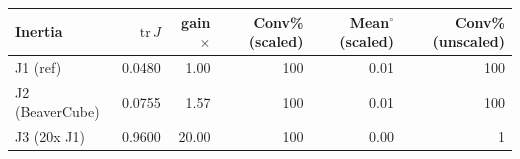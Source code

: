 \begin{tabular}{l r r r r r}
\toprule
Inertia & $\mathrm{tr}\,J$ & gain$\times$ & Conv\% (scaled) & Mean$^\circ$ (scaled) & Conv\% (unscaled) \\
\midrule
J1 (ref) & 0.0480 & 1.00 & 100 & 0.01 & 100 \\
J2 (BeaverCube) & 0.0755 & 1.57 & 100 & 0.01 & 100 \\
J3 (20x J1) & 0.9600 & 20.00 & 100 & 0.00 & 1 \\
\bottomrule
\end{tabular}
